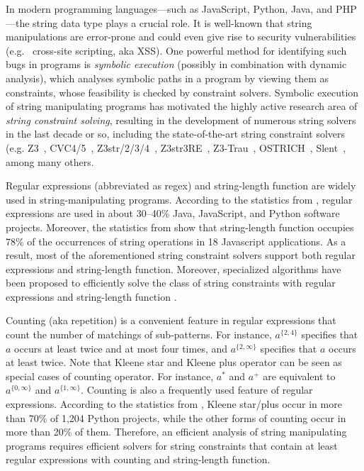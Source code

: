 %

In modern programming languages---such as JavaScript, Python, Java, and PHP---the string data type plays a crucial role. 
It is well-known that string manipulations are error-prone and could even give rise to security vulnerabilities (e.g. \ cross-site scripting, aka XSS). 
One powerful method for identifying such bugs in programs is \emph{symbolic execution} (possibly in combination with dynamic analysis), which analyses symbolic paths in a program by viewing them as constraints, whose feasibility is checked by constraint solvers. 
%
Symbolic execution of string manipulating programs has motivated the highly active research area of \emph{string constraint solving}, resulting in the development of numerous string solvers in the last decade or so, including the state-of-the-art string constraint solvers (e.g.
Z3~\cite{Z3}, CVC4/5~\cite{cvc4}, Z3str/2/3/4~\cite{Z3-str,Z3-str2,Z3-str3,BerzishMurphy2021}, Z3str3RE~\cite{BD+23}, 
Z3-Trau~\cite{Z3-trau}, OSTRICH~\cite{CHL+19}, Slent~\cite{WC+18}, among many others. 

Regular expressions (abbreviated as regex) and string-length function are widely used in string-manipulating programs. According to the statistics from \cite{CS16,DCSL18,WS18}, regular expressions are used in about 30–40\% Java, JavaScript, and Python software projects. 
Moreover, the statistics from \cite{malware_detection_3_kudzu} show that string-length function occupies 78\% of the occurrences of string operations in 18 Javascript applications. 
As a result, most of the aforementioned string constraint solvers support both regular expressions and string-length function. Moreover, specialized algorithms have been proposed to efficiently solve the class of string constraints with regular expressions and string-length function \cite{LTR+15,BD+23}. 

Counting (aka repetition) is a convenient feature in regular expressions that count the number of matchings of sub-patterns. For instance, $a^{\{2, 4\}}$ specifies that $a$ occurs at least twice and at most four times, and $a^{\{2, \infty\}}$ specifies that $a$ occurs at least twice. 
Note that Kleene star and Kleene plus operator can be seen as special cases of counting operator. For instance, $a^*$ and $a^+$ are equivalent to $a^{\{0,\infty\}}$ and $a^{\{1,\infty\}}$.
Counting is also a frequently used feature of regular expressions. According to the statistics from \cite{CS16}, Kleene star/plus occur in more than 70\% of 1,204 Python projects, while the other forms of counting occur in more than 20\% of them. Therefore, an efficient analysis of string manipulating programs requires efficient solvers for string constraints that contain at least regular expressions with counting and string-length function. 

